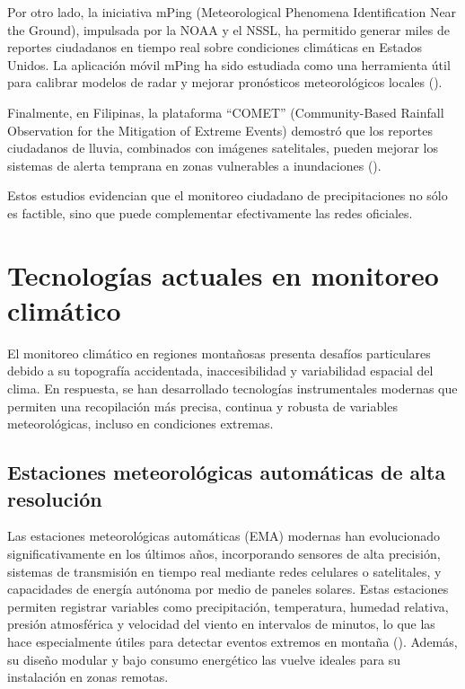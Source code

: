 Por otro lado, la iniciativa mPing (Meteorological Phenomena Identification Near the Ground), impulsada por la NOAA y el NSSL, ha permitido generar miles de reportes ciudadanos en tiempo real sobre condiciones climáticas en Estados Unidos. La aplicación móvil mPing ha sido estudiada como una herramienta útil para calibrar modelos de radar y mejorar pronósticos meteorológicos locales  (\cite{elmore2014mping}).

Finalmente, en Filipinas, la plataforma ``COMET'' (Community-Based Rainfall Observation for the Mitigation of Extreme Events) demostró que los reportes ciudadanos de lluvia, combinados con imágenes satelitales, pueden mejorar los sistemas de alerta temprana en zonas vulnerables a inundaciones (\cite{okada2019community}).

Estos estudios evidencian que el monitoreo ciudadano de precipitaciones no sólo es factible, sino que puede complementar efectivamente las redes oficiales.

































\newpage
\section{Tecnologías actuales en monitoreo climático}
El monitoreo climático en regiones montañosas presenta desafíos particulares debido a su topografía accidentada, inaccesibilidad y variabilidad espacial del clima. En respuesta, se han desarrollado tecnologías instrumentales modernas que permiten una recopilación más precisa, continua y robusta de variables meteorológicas, incluso en condiciones extremas.

\subsection{Estaciones meteorológicas automáticas de alta resolución}

Las estaciones meteorológicas automáticas (EMA) modernas han evolucionado significativamente en los últimos años, incorporando sensores de alta precisión, sistemas de transmisión en tiempo real mediante redes celulares o satelitales, y capacidades de energía autónoma por medio de paneles solares. Estas estaciones permiten registrar variables como precipitación, temperatura, humedad relativa, presión atmosférica y velocidad del viento en intervalos de minutos, lo que las hace especialmente útiles para detectar eventos extremos en montaña (\cite{sabziparvar2019estimation}). Además, su diseño modular y bajo consumo energético las vuelve ideales para su instalación en zonas remotas.


